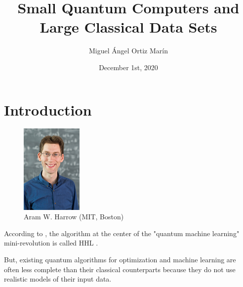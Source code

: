 \documentclass[
  ignorenonframetext,
]{beamer}
\title{Small Quantum Computers and Large Classical Data Sets
\cite{harrow2020small}}
\author{Miguel Ángel Ortiz Marín}
\date{December 1st, 2020}
\begin{document}
\frame{\titlepage}

\begin{frame}[allowframebreaks]
  \tableofcontents[hideallsubsections]
\end{frame}
\hypertarget{introduction}{%
\section{Introduction}\label{introduction}}

\begin{frame}{}
\protect\hypertarget{section}{}
\begin{figure}
\centering
\includegraphics[width=3cm]{harrow_aram.jpg}
\caption{Aram W. Harrow (MIT, Boston)}
\end{figure}

\begin{small}
According to \cite{Aaronson2015}, the algorithm at the center of the "quantum machine learning" mini-revolution is called HHL \cite{Harrow2009}.

But, existing quantum algorithms for optimization and machine learning are often less complete than their classical counterparts because they do not use realistic models of their input data.
\end{small}
\end{frame}
\end{document}
